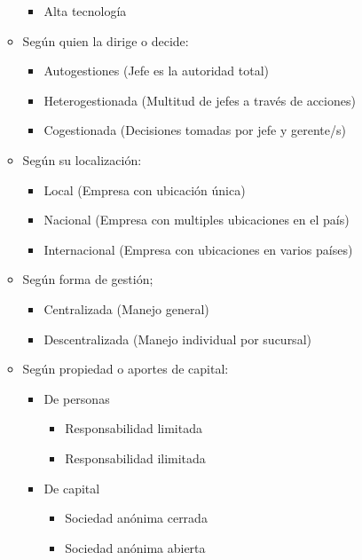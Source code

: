 \documentclass{templateNote}
\begin{document}
\begin{itemize}
\begin{itemize}
\begin{itemize}
                \item Alta tecnología
            \end{itemize}
        \item Según quien la dirige o decide:
            \begin{itemize}
                \item Autogestiones (Jefe es la autoridad total)
                \item Heterogestionada (Multitud de jefes a través de acciones)
                \item Cogestionada (Decisiones tomadas por jefe y gerente/s)
            \end{itemize}
        \item Según su localización:
            \begin{itemize}
                \item Local (Empresa con ubicación única)
                \item Nacional (Empresa con multiples ubicaciones en el país)
                \item Internacional (Empresa con ubicaciones en varios países)
            \end{itemize}
        \item Según forma de gestión;
            \begin{itemize}
                \item Centralizada (Manejo general)
                \item Descentralizada (Manejo individual por sucursal)
            \end{itemize}
        \item Según propiedad o aportes de capital:
            \begin{itemize}
                \item De personas
                    \begin{itemize}
                        \item Responsabilidad limitada
                        \item Responsabilidad ilimitada
                    \end{itemize}
                \item De capital
                    \begin{itemize}
                        \item Sociedad anónima cerrada
                        \item Sociedad anónima abierta
                    \end{itemize}

\end{itemize}
\end{itemize}
\end{itemize}
\end{document}
